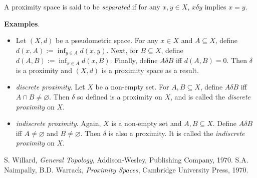 \documentclass[12pt]{article}
\begin{document}
A proximity space is said to be \emph{separated} if for any $x,y\in X$, $x\delta y$ implies $x=y$.

\textbf{Examples}.  
\begin{itemize}
\item
Let $(X,d)$ be a pseudometric space.  For any $x\in X$ and $A\subseteq X$, define $d(x,A):=\inf_{y\in A} d(x,y)$.  Next, for $B\subseteq X$, define $d(A,B):=\inf_{x\in A} d(x,B)$.  Finally, define $A\delta B$ iff $d(A,B)=0$.  Then $\delta$ is a proximity and $(X,d)$ is a proximity space as a result.
\item
\emph{discrete proximity}.  Let $X$ be a non-empty set.  For $A,B\subseteq X$, define $A\delta B$ iff $A\cap B\ne\varnothing$.  Then $\delta$ so defined is a proximity on $X$, and is called the \emph{discrete proximity} on $X$.
\item
\emph{indiscrete proximity}.  Again, $X$ is a non-empty set and $A,B\subseteq X$.  Define $A\delta B$ iff $A\ne \varnothing$ and $B\ne \varnothing$.  Then $\delta$ is also a proximity.  It is called the \emph{indiscrete proximity} on $X$.
\end{itemize}

\begin{thebibliography}{9}
 S. Willard, \emph{General Topology},
Addison-Wesley, Publishing Company, 1970.
 S.A. Naimpally, B.D. Warrack, \emph{Proximity Spaces}, Cambridge University Press, 1970.
\end{thebibliography}
\end{document}
